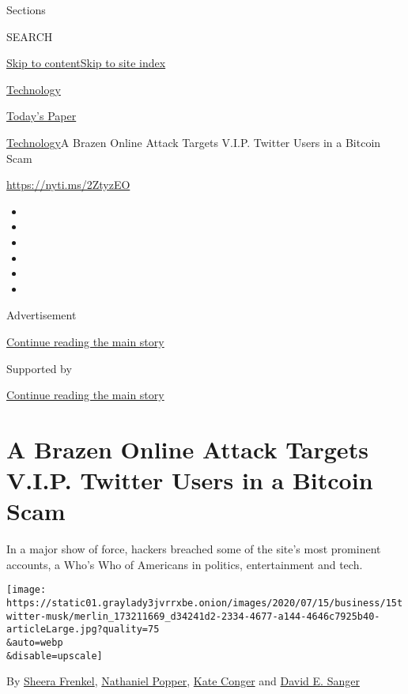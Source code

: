 Sections

SEARCH

\protect\hyperlink{site-content}{Skip to
content}\protect\hyperlink{site-index}{Skip to site index}

\href{https://www.nytimes3xbfgragh.onion/section/technology}{Technology}

\href{https://myaccount.nytimes3xbfgragh.onion/auth/login?response_type=cookie\&client_id=vi}{}

\href{https://www.nytimes3xbfgragh.onion/section/todayspaper}{Today's
Paper}

\href{/section/technology}{Technology}\textbar{}A Brazen Online Attack
Targets V.I.P. Twitter Users in a Bitcoin Scam

\href{https://nyti.ms/2ZtyzEO}{https://nyti.ms/2ZtyzEO}

\begin{itemize}
\item
\item
\item
\item
\item
\item
\end{itemize}

Advertisement

\protect\hyperlink{after-top}{Continue reading the main story}

Supported by

\protect\hyperlink{after-sponsor}{Continue reading the main story}

\hypertarget{a-brazen-online-attack-targets-vip-twitter-users-in-a-bitcoin-scam}{%
\section{A Brazen Online Attack Targets V.I.P. Twitter Users in a
Bitcoin
Scam}\label{a-brazen-online-attack-targets-vip-twitter-users-in-a-bitcoin-scam}}

In a major show of force, hackers breached some of the site's most
prominent accounts, a Who's Who of Americans in politics, entertainment
and tech.

\texttt{[image: https://static01.graylady3jvrrxbe.onion/images/2020/07/15/business/15twitter-musk/merlin\_173211669\_d34241d2-2334-4677-a144-4646c7925b40-articleLarge.jpg?quality=75\\\&auto=webp\\\&disable=upscale]}

By \href{https://www.nytimes3xbfgragh.onion/by/sheera-frenkel}{Sheera
Frenkel},
\href{https://www.nytimes3xbfgragh.onion/by/nathaniel-popper}{Nathaniel
Popper}, \href{https://www.nytimes3xbfgragh.onion/by/kate-conger}{Kate
Conger} and
\href{https://www.nytimes3xbfgragh.onion/by/david-e-sanger}{David E.
Sanger}


